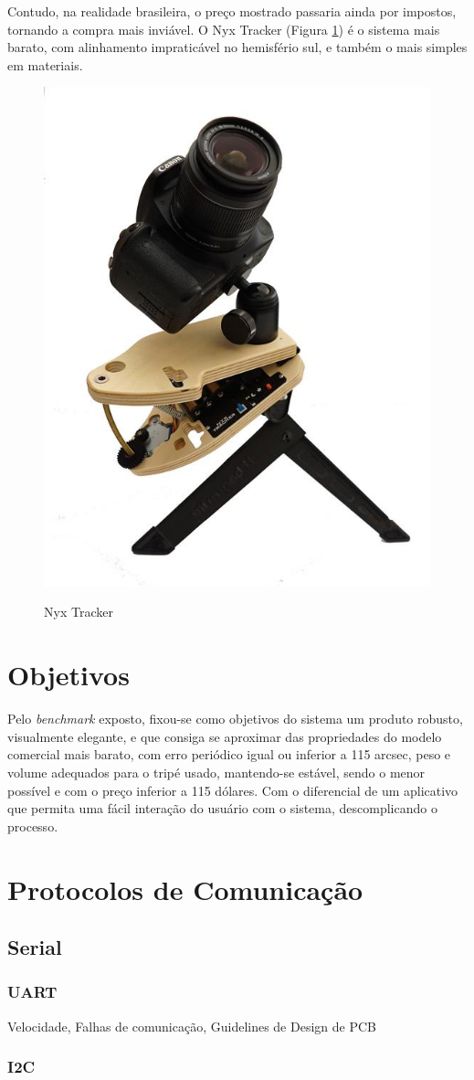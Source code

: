 Contudo, na realidade brasileira, o preço mostrado passaria ainda por impostos, tornando a compra mais inviável. O Nyx Tracker (Figura \ref{fig:nyxtracker}) é o sistema mais barato, com alinhamento impraticável no hemisfério sul, e também o mais simples em materiais.

\begin{figure}[h]
	\centering
	\caption{Nyx Tracker}
	\includegraphics[width=0.3\linewidth]{figuras/nyxtracker}
	\label{fig:nyxtracker}
\end{figure}


\section{Objetivos}

Pelo \textit{benchmark} exposto, fixou-se como objetivos do sistema um produto robusto, visualmente elegante, e que consiga se aproximar das propriedades do modelo comercial mais barato, com erro periódico igual ou inferior a 115 arcsec, peso e volume adequados para o tripé usado, mantendo-se estável, sendo o menor possível e com o preço inferior a 115 dólares. Com o diferencial de um aplicativo que permita uma fácil interação do usuário com o sistema, descomplicando o processo.

\section{Protocolos de Comunicação}

\subsection{Serial}
\subsubsection{UART}
Velocidade, Falhas de comunicação, Guidelines de Design de PCB

\subsubsection{I2C}

